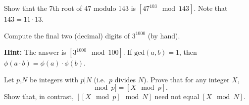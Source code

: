 \documentclass[a4paper,10pt,landscape,twocolumn]{scrartcl}
\begin{document}
\problems

\begin{exercise}
\begin{subex}
Show that the 7th root of 47 modulo 143 is $[47^{103} \mod 143]$. Note that $143=11\cdot 13$.
\end{subex}

\begin{subex}
Compute the final two (decimal) digits of $3^{1000}$ (by hand).

\textbf{Hint:} The answer is $[3^{1000} \mod 100]$. If $\text{gcd}(a,b)=1$, then $\phi(a\cdot b)=\phi(a)\cdot\phi(b)$.
\end{subex}

\begin{subex}
Let $p$,$N$ be integers with $p|N$ (i.e.\ $p$ divides $N$). Prove that for any integer $X$,
\begin{equation*}
[[X \mod N]\mod p]=[X \mod p].
\end{equation*}
Show that, in contrast, $[[X \mod p]\mod N]$ need not equal $[X\mod N]$.
\end{subex}

\end{exercise}


%

\end{document}
